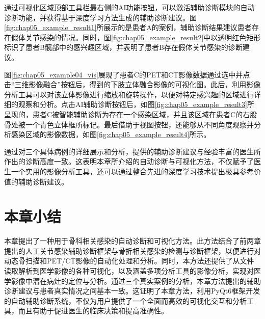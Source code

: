 通过可视化区域顶部工具栏最右侧的AI功能按钮，可以激活辅助诊断模块的自动诊断功能，并获得基于深度学习方法生成的辅助诊断建议。图\ref{fig:chap05_example_result1}所展示的是患者A的案例，辅助诊断结果建议患者存在假体关节感染的情况。同时，图\ref{fig:chap05_example_result2}中以透明红色矩形标识了患者B髋部中的感兴趣区域，并表明了患者B存在假体关节感染的诊断建议。

图\ref{fig:chap05_example04_vis}展现了患者C的PET和CT影像数据通过选中并点击“三维影像融合”按钮后，得到的下肢立体融合影像的可视化图。此后，利用影像分析工具可以对该立体影像进行缩放和旋转操作，以便对特定感兴趣的区域进行详细的观察和分析。点击AI辅助诊断按钮后，如图\ref{fig:chap05_example_result3}所呈现的，患者C被智能辅助诊断为存在一个感染区域，并且该区域在患者C的右股骨处被一个青色立体框所标记。最后借助于视图按钮，还能够从不同角度观察并分析感染区域的影像数据，如图\ref{fig:chap05_example_result4}所示。

通过对三个具体病例的详细展示和分析，提供的辅助诊断建议与经验丰富的医生所作出的诊断高度一致。这表明本章所介绍的自动诊断与可视化方法，不仅赋予了医生一个实用的影像分析工具，还可以通过整合先进的深度学习技术提出极具参考价值的辅助诊断建议。

\section{本章小结}

本章提出了一种用于骨科相关感染的自动诊断和可视化方法。此方法结合了前两章提出的人工关节感染辅助诊断框架与骨折相关感染的检测与诊断框架，以便进行对动态骨扫描和PET/CT影像的自动化处理和分析。同时，本方法还提供了从文件读取解析到医学影像的各种可视化，以及涵盖多项分析工具的影像分析，实现对医学影像中潜在病灶的定位与分析。通过三个真实案例的分析，本章方法提出的辅助诊断建议与患者真实情况之间基本一致。这证明了本章方法，利用PyQt6框架开发的自动辅助诊断系统，不仅为用户提供了一个全面而高效的可视化交互和分析工具，而且有助于促进医生的临床决策和提高准确性。